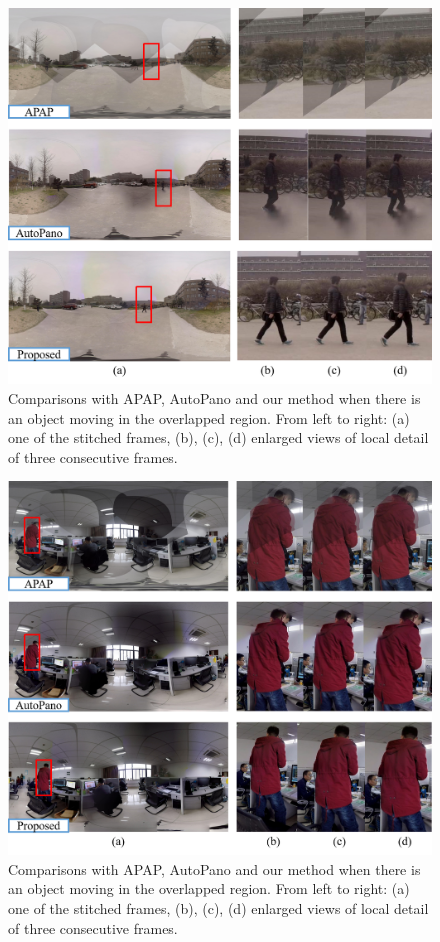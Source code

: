 \documentclass[conference]{IEEEtran}
\begin{document}


\begin{figure}[t]
\centering
\includegraphics[scale=0.38]{picture37.png}
\caption{Comparisons with APAP, AutoPano and our method when there is an object moving in the overlapped region. From left to right: (a) one of the stitched frames, 
(b), (c), (d) enlarged views of local detail of three consecutive frames.}
\label{fig:more1}
\end{figure}
\begin{figure}[t]
\centering
\includegraphics[scale=0.38]{picture38.png}
\caption{Comparisons with APAP, AutoPano and our method when there is an object moving in the overlapped region. From left to right: (a) one of the stitched frames, 
(b), (c), (d) enlarged views of local detail of three consecutive frames.}
\label{fig:more2}
\end{figure}
\end{document}
